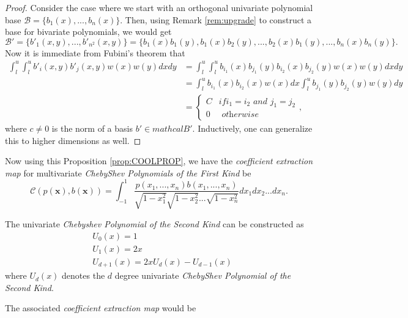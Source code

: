 \documentclass[12pt]{amsart}
\numberwithin{equation}{section}
\theoremstyle{definition}
\numberwithin{thm}{section}
\begin{document}
\begin{proof}
     Consider the case where we start with an orthogonal univariate polynomial base $\mathcal{B} = \{b_1(x), ..., b_n(x)\}$. 
     Then, using Remark \ref{rem:upgrade} to construct a base for bivariate polynomials, we would get 
     \begin{equation*}
          \mathcal{B}' =  \{b'_1(x, y), ..., b'_{n^2}(x, y)\} = \{b_1(x)b_1(y), b_1(x)b_2(y), ..., b_2(x)b_1(y), ..., b_n(x)b_n(y)\}.
     \end{equation*}
     Now it is immediate from Fubini's theorem that
     \begin{align*}
          \int_l^u \int_l^u  b'_i(x, y)b'_j(x, y)w(x)w(y) dx dy  & = \int_l^u \int_l^u  b_{i_1}(x) b_{j_1}(y) b_{i_2}(x)b_{j_2}(y) w(x)w(y) dx dy \\
               & = \int_l^u  b_{i_1}(x) b_{i_2}(x) w(x) dx  \int_l^u b_{j_1}(y) b_{j_2}(y) w(y) dy \\
               & = \begin{cases}
                    C & if i_1 = i_2 \textit{ and } j_1 = j_2\\
                    0 & \textit{ otherwise }
              \end{cases},
     \end{align*}
     where $c \neq 0$ is the norm of a basis $b' \in mathcal{B}'$.
     Inductively, one can generalize this to higher dimensions as well.
\end{proof}

Now using this Proposition \ref{prop:COOLPROP}, we have the \emph{coefficient extraction map} for multivariate \emph{ChebyShev Polynomials of the First Kind} be
\begin{equation*}
     \mathcal{C}(p(\mathbf{x}), b(\mathbf{x})) = \int_{-1}^1 \frac{p(x_1, ..., x_n)b(x_1, ..., x_n)}{\sqrt{1-x_1^2} \sqrt{1-x_2^2} ... \sqrt{1-x_n^2}} dx_1dx_2 ... dx_n.
\end{equation*} 

The univariate \emph{Chebyshev Polynomial of the Second Kind} can be constructed as
\begin{align*} 
     &U_0(x) = 1 \\ 
     &U_1(x) = 2x \\
     &U_{d+1}(x) = 2x U_d(x) - U_{d-1}(x)
\end{align*}
where $U_d(x)$ denotes the $d$ degree univariate \emph{ChebyShev Polynomial of the Second Kind}.

The associated \emph{coefficient extraction map} would be
\end{document}
